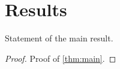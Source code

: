 \section{Results}
\label{sec:results}

\begin{theorem}
\label{thm:main}
Statement of the main result.
\end{theorem}

\begin{proof}
Proof of \cref{thm:main}.
\end{proof}

%
%
